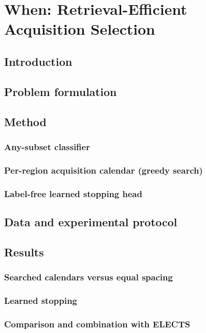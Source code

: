 \chapter{When: Retrieval-Efficient Acquisition Selection}
\label{ch:when}


\section{Introduction}

\section{Problem formulation}

\section{Method}
\subsection{Any-subset classifier}
\subsection{Per-region acquisition calendar (greedy search)}
\subsection{Label-free learned stopping head}

\section{Data and experimental protocol}

\section{Results}
\subsection{Searched calendars versus equal spacing}
\subsection{Learned stopping}
\subsection{Comparison and combination with ELECTS}
